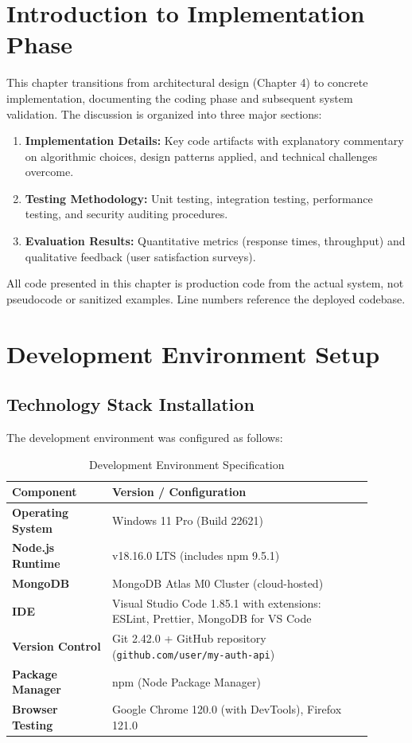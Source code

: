 \documentclass[12pt, a4paper]{report}
\begin{document}
\section{Introduction to Implementation Phase}

This chapter transitions from architectural design (Chapter 4) to concrete implementation, documenting the coding phase and subsequent system validation. The discussion is organized into three major sections:

\begin{enumerate}
    \item \textbf{Implementation Details:} Key code artifacts with explanatory commentary on algorithmic choices, design patterns applied, and technical challenges overcome.
    \item \textbf{Testing Methodology:} Unit testing, integration testing, performance testing, and security auditing procedures.
    \item \textbf{Evaluation Results:} Quantitative metrics (response times, throughput) and qualitative feedback (user satisfaction surveys).
\end{enumerate}

All code presented in this chapter is production code from the actual system, not pseudocode or sanitized examples. Line numbers reference the deployed codebase.

\section{Development Environment Setup}

\subsection{Technology Stack Installation}

The development environment was configured as follows:

\begin{table}[H]
\centering
\caption{Development Environment Specification}
\label{tab:dev_env}
\begin{tabular}{@{}p{0.25\linewidth}p{0.65\linewidth}@{}}
\toprule
\textbf{Component} & \textbf{Version / Configuration} \\
\midrule
\textbf{Operating System} & Windows 11 Pro (Build 22621) \\
\textbf{Node.js Runtime} & v18.16.0 LTS (includes npm 9.5.1) \\
\textbf{MongoDB} & MongoDB Atlas M0 Cluster (cloud-hosted) \\
\textbf{IDE} & Visual Studio Code 1.85.1 with extensions: ESLint, Prettier, MongoDB for VS Code \\
\textbf{Version Control} & Git 2.42.0 + GitHub repository (\texttt{github.com/user/my-auth-api}) \\
\textbf{Package Manager} & npm (Node Package Manager) \\
\textbf{Browser Testing} & Google Chrome 120.0 (with DevTools), Firefox 121.0 \\
\bottomrule
\end{tabular}
\end{table}
\end{document}
